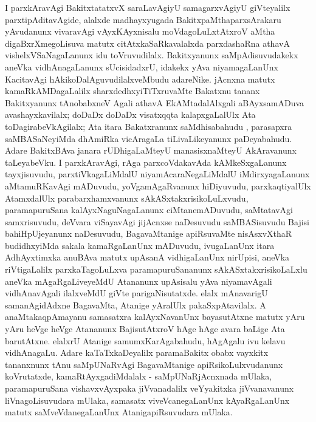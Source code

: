 I parxkAravAgi BakitxtatatxvX saraLavAgiyU samagarxvAgiyU giVteyalilx parxti\-pAdita\-vAgide, alalxde madhayxyugada BakitxpaMthaparxsArakaru yAvudanunx vivaravAgi vAyxKAyxni\-salu moVdagoLuLxtAtxroV aMtha digaBxrXmegoLisuva matutx citAtxkaSaRkavalalxda parxdashaRna athavA vishelxVSaNagaLanunx idu toVruvudilalx. Bakitxyanunx saMpAdisuvudakekx aneVka vidhAnagaLanunx sUcisidadxrU, idakekx yAva niyamagaLanUnx KacitavAgi hAki\-koDa\-lAguvudilalxveMbudu adareNike. jAcnxna matutx kamaRkAMDagaLalilx sharxdedhxyiTiTxruvaMte Bakatxnu tananx Bakitxyanunx tAnobabxneV Agali athavA EkAMtadalAlxgali aBAyxsamADuva avashayxkavilalx; doDaDx doDaDx visatxqqta kalapxgaLalUlx Ata toDagirabeVkAgilalx; Ata itara Bakatxranunx saMdhisabahudu , parasapxra saMBASaNeyiMda dhAmiRka vicAragaLa tiLivaLikeyanunx paDeyabahudu. Adare BakitxBAva janara rUDhigaLaMteyU manasisx\-naMteyU AkAravanunx taLeyabeVku. I parxkAravAgi, rAga parxcoVdakavAda kAMkeSx\-gaLanunx tayxjisuvudu, parxtiVkagaLiMdalU niyamAcaraNegaLiMdalU iMdirxyagaLanunx aMtamuRKavAgi mADuvudu, yoVgamAgaRvanunx hiDiyuvudu, parxkaqtiyalUlx AtamxdalUlx parabarxhamxvanunx sAkASxtakxrisikoLuLxvudu, paramapuruSana kalAyxNaguNagaLanunx ciMtanemADuvudu, saMtatavAgi samxrisuvudu, deVvara viSayavAgi jijAcnxse naDesuvudu saMBASisuvudu Bajisi bahiHpUjeyanunx naDesuvudu, BagavaMtanige apiRsuvaMte nisAsxvXthaR budidhxyiMda sakala kamaRgaLanUnx mADuvudu, ivugaLanUnx itara AdhAyxtimxka anuBAva matutx upAsanA vidhigaLanUnx nirUpisi, aneVka riVtigaLalilx parxkaTagoLuLxva paramapuruSananunx sAkASxtakxrisikoLaLxlu aneVka mAgaRgaLiveyeMdU Atananunx upAsisalu yAva niyamavAgali vidhAnavAgali ilalxveMdU giVte parigaNisutatxde. elalx mAnavarigU samanAgidAdxne BagavaMta, Atanige yAralUlx pakaSxpAtavilalx. A anaMtakaqpAmayanu samasatxra kalAyxNavanUnx bayasutAtxne matutx yAru yAru heVge heVge Atananunx BajisutAtxroV hAge hAge avara baLige Ata barutAtxne. elalxrU Atanige samumxKarAgabahudu, hAgAgalu ivu kelavu vidhAnagaLu. Adare kaTaTxkaDeyalilx paramaBakitx obabx vayxkitx tananxnunx tAnu saMpUNaRvAgi BagavaMtanige apiRsikoLulxvudanunx koVrutatxde, kamaRtAyxgadiMdalalx - saMpUNaRjAcnxnada mUlaka, paramapuruSana vishavxvAyxpaka jiVvanadalilx veYyakitxka jiVvanavanunx liVnagoLisuvudara mUlaka, samasatx viveVcanegaLanUnx kAyaRgaLanUnx matutx saMveVdanegaLanUnx AtanigapiRsuvudara mUlaka. 

